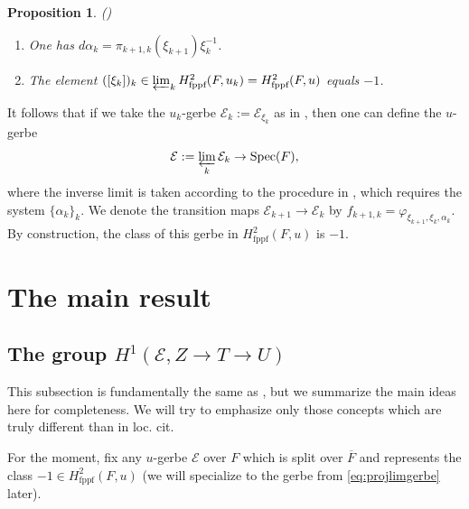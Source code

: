 \documentclass{amsart}
\newtheorem{proposition}[result]{Proposition}
\theoremstyle{definition}
\theoremstyle{remark}
\newcommand\Spec{\mathrm{Spec}}
\newcommand{\ov}{\overline}
\begin{document}
\begin{proposition}{(\cite[Lemma 4.8]{Dillery1})}
    \begin{enumerate}
        \item{One has $d\alpha_{k} = \pi_{k+1,k}(\xi_{k+1})\xi_{k}^{-1}$.}
        \item{The element $([\xi_{k}])_{k} \in \varprojlim_{k} H_{\textnormal{fppf}}^{2}(F,u_{k}) = H_{\textnormal{fppf}}^{2}(F,u)$ equals $-1$.}
    \end{enumerate}
\end{proposition}

It follows that if we take the $u_{k}$-gerbe $\mathcal{E}_{k} := \mathcal{E}_{\xi_{k}}$ as in \cite[Definition 2.35]{Dillery1}, then one can define the $u$-gerbe
\begin{equation}\label{eq:projlimgerbe}
    \mathcal{E}:= \varprojlim_{k} \mathcal{E}_{k} \to \Spec(F),
\end{equation}
where the inverse limit is taken according to the procedure in \cite[\S 2.7]{Dillery1}, which requires the system $\{\alpha_{k}\}_{k}$. We denote the transition maps $\mathcal{E}_{k+1} \to \mathcal{E}_{k}$ by $f_{k+1,k}=\varphi_{\xi_{k+1},\xi_{k},\alpha_{k}}$. By construction, the class of this gerbe in $H_{\text{fppf}}^{2}(F,u)$ is $-1$.



\section{The main result}\label{sec:mainsec}
\subsection{The group $H^{1}(\mathcal{E}, Z \to T \to U)$}\label{sec:H1def}
This subsection is fundamentally the same as \cite[\S 5.1]{Kal26b}, but we summarize the main ideas here for completeness. We will try to emphasize only those concepts which are truly different than in loc. cit.

For the moment, fix any $u$-gerbe $\mathcal{E}$ over $F$ which is split over $\ov{F}$ and represents the class $-1 \in H_{\text{fppf}}^{2}(F,u)$ (we will specialize to the gerbe from \eqref{eq:projlimgerbe} later). 
\end{document}
